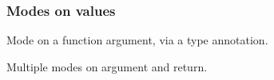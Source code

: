 \subsubsection{Modes on values\label{Oxcaml_impl--modes-on-values}}%
\label{Oxcaml_impl--val-mode_arg}\begin{ocamlindent}Mode on a function argument, via a type annotation.\end{ocamlindent}%
\medbreak
\label{Oxcaml_impl--val-mode_multi}\begin{ocamlindent}Multiple modes on argument and return.\end{ocamlindent}%
\medbreak
